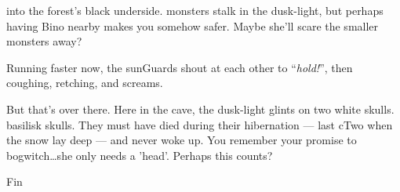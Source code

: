 into the forest's black underside.
\Glspl{monster} stalk in the dusk-light, but perhaps having Bino nearby makes you somehow safer.
Maybe she'll scare the smaller \glspl{monster} away?

Running faster now, the \glspl{sunGuard} shout at each other to ``\textit{hold!}'', then coughing, retching, and screams.

But that's over there.
Here in the cave, the dusk-light glints on two white skulls.
\Gls{basilisk} skulls.
They must have died during their hibernation --- last \gls{cTwo} when the snow lay deep --- and never woke up.
You remember your promise to \gls{bogwitch}\ldots she only needs a 'head'.
Perhaps this counts?

Fin

